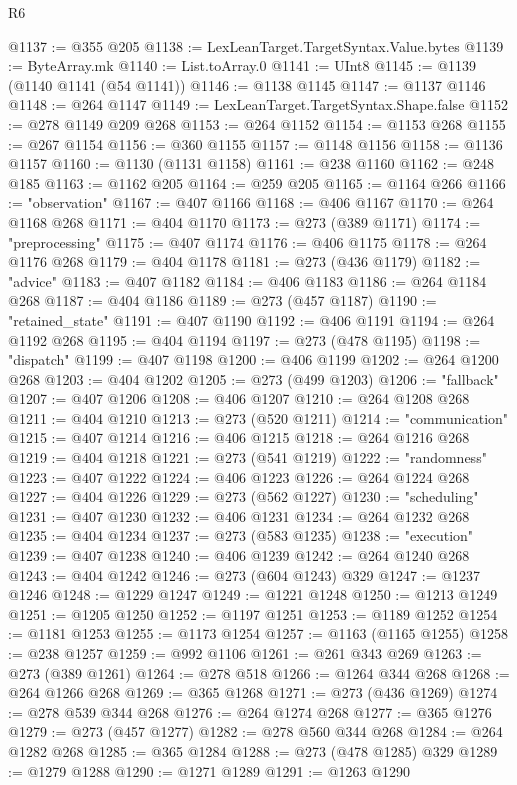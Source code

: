 \begin{lexlean}{R6}
\begin{coremodule}
{{{{{{{{{{{{{{{{{{{@1137 := @355 @205
@1138 := LexLeanTarget.TargetSyntax.Value.bytes
@1139 := ByteArray.mk
@1140 := List.toArray.{0}
@1141 := UInt8
@1145 := @1139 (@1140 @1141 (@54 @1141))
@1146 := @1138 @1145
@1147 := @1137 @1146
@1148 := @264 @1147
@1149 := LexLeanTarget.TargetSyntax.Shape.false
@1152 := @278 @1149 @209 @268
@1153 := @264 @1152
@1154 := @1153 @268
@1155 := @267 @1154
@1156 := @360 @1155
@1157 := @1148 @1156
@1158 := @1136 @1157
@1160 := @1130 (@1131 @1158)
@1161 := @238 @1160
@1162 := @248 @185
@1163 := @1162 @205
@1164 := @259 @205
@1165 := @1164 @266
@1166 := "observation"
@1167 := @407 @1166
@1168 := @406 @1167
@1170 := @264 @1168 @268
@1171 := @404 @1170
@1173 := @273 (@389 @1171)
@1174 := "preprocessing"
@1175 := @407 @1174
@1176 := @406 @1175
@1178 := @264 @1176 @268
@1179 := @404 @1178
@1181 := @273 (@436 @1179)
@1182 := "advice"
@1183 := @407 @1182
@1184 := @406 @1183
@1186 := @264 @1184 @268
@1187 := @404 @1186
@1189 := @273 (@457 @1187)
@1190 := "retained_state"
@1191 := @407 @1190
@1192 := @406 @1191
@1194 := @264 @1192 @268
@1195 := @404 @1194
@1197 := @273 (@478 @1195)
@1198 := "dispatch"
@1199 := @407 @1198
@1200 := @406 @1199
@1202 := @264 @1200 @268
@1203 := @404 @1202
@1205 := @273 (@499 @1203)
@1206 := "fallback"
@1207 := @407 @1206
@1208 := @406 @1207
@1210 := @264 @1208 @268
@1211 := @404 @1210
@1213 := @273 (@520 @1211)
@1214 := "communication"
@1215 := @407 @1214
@1216 := @406 @1215
@1218 := @264 @1216 @268
@1219 := @404 @1218
@1221 := @273 (@541 @1219)
@1222 := "randomness"
@1223 := @407 @1222
@1224 := @406 @1223
@1226 := @264 @1224 @268
@1227 := @404 @1226
@1229 := @273 (@562 @1227)
@1230 := "scheduling"
@1231 := @407 @1230
@1232 := @406 @1231
@1234 := @264 @1232 @268
@1235 := @404 @1234
@1237 := @273 (@583 @1235)
@1238 := "execution"
@1239 := @407 @1238
@1240 := @406 @1239
@1242 := @264 @1240 @268
@1243 := @404 @1242
@1246 := @273 (@604 @1243) @329
@1247 := @1237 @1246
@1248 := @1229 @1247
@1249 := @1221 @1248
@1250 := @1213 @1249
@1251 := @1205 @1250
@1252 := @1197 @1251
@1253 := @1189 @1252
@1254 := @1181 @1253
@1255 := @1173 @1254
@1257 := @1163 (@1165 @1255)
@1258 := @238 @1257
@1259 := @992 @1106
@1261 := @261 @343 @269
@1263 := @273 (@389 @1261)
@1264 := @278 @518
@1266 := @1264 @344 @268
@1268 := @264 @1266 @268
@1269 := @365 @1268
@1271 := @273 (@436 @1269)
@1274 := @278 @539 @344 @268
@1276 := @264 @1274 @268
@1277 := @365 @1276
@1279 := @273 (@457 @1277)
@1282 := @278 @560 @344 @268
@1284 := @264 @1282 @268
@1285 := @365 @1284
@1288 := @273 (@478 @1285) @329
@1289 := @1279 @1288
@1290 := @1271 @1289
@1291 := @1263 @1290
}}}}}}}}}}}}}}}}}}}
\end{coremodule}
\end{lexlean}
